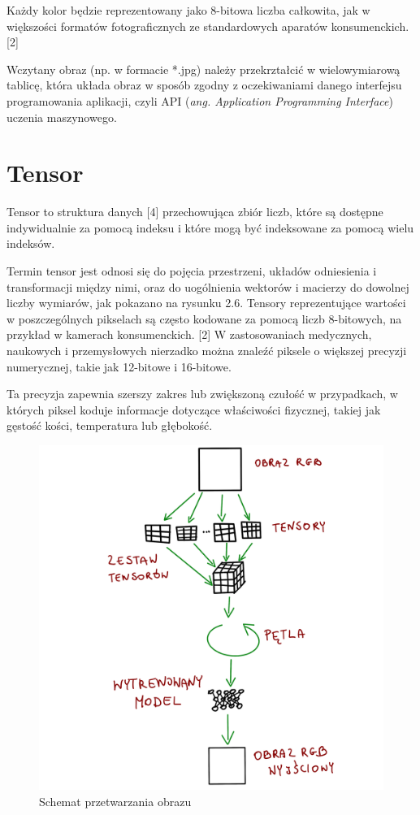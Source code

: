 \documentclass[brudnopis]{xmgr}
\begin{document}
Każdy kolor będzie reprezentowany jako 8-bitowa liczba całkowita, jak w większości formatów fotograficznych ze standardowych aparatów konsumenckich. [2]

Wczytany obraz (np. w formacie *.jpg) należy przekrztałcić w wielowymiarową tablicę, która układa obraz w sposób zgodny z oczekiwaniami danego interfejsu programowania aplikacji, czyli API (\textit{ang. Application Programming Interface}) uczenia maszynowego.

\section{Tensor\label{s:dsssl}}


Tensor to struktura danych [4] przechowująca zbiór liczb, które są dostępne indywidualnie za pomocą indeksu i które mogą być indeksowane za pomocą wielu indeksów.

Termin tensor jest odnosi się do pojęcia przestrzeni, układów odniesienia i transformacji między nimi, oraz do uogólnienia wektorów i macierzy do dowolnej liczby wymiarów, jak pokazano na rysunku 2.6.
Tensory reprezentujące wartości w poszczególnych pikselach są często kodowane za pomocą liczb 8-bitowych, na przykład w kamerach konsumenckich. [2] W zastosowaniach medycznych, naukowych i przemysłowych nierzadko można znaleźć piksele o większej precyzji numerycznej, takie jak 12-bitowe i 16-bitowe.

 Ta precyzja zapewnia szerszy zakres lub zwiększoną czułość w przypadkach, w których piksel koduje informacje dotyczące właściwości fizycznej, takiej jak gęstość kości, temperatura lub głębokość.
 
 \begin{figure}[!tbh]
\centering
\includegraphics[width=.8\hsize]{fig/5}
\caption{Schemat przetwarzania obrazu\label{RYS.5}}
\end{figure}
\end{document}
